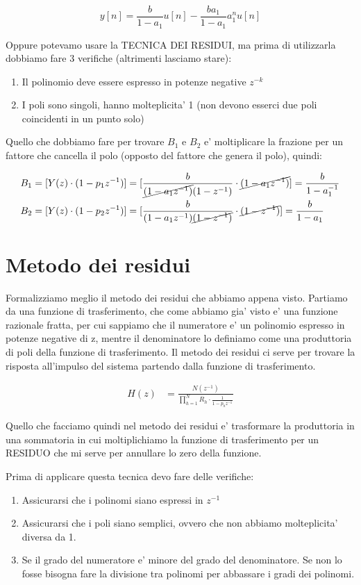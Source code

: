 \[
    y[n] = \frac{b}{1 - a_1} u[n] - \frac{b a_1}{1 - a_1} a_1^n u[n]
\]

Oppure potevamo usare la TECNICA DEI RESIDUI, ma prima di utilizzarla dobbiamo fare 3 verifiche (altrimenti lasciamo stare):
\begin{enumerate}
    \item Il polinomio deve essere espresso in potenze negative $z^{-k}$
    \item I poli sono singoli, hanno molteplicita' 1 (non devono esserci due poli coincidenti in un punto solo)
\end{enumerate}

Quello che dobbiamo fare per trovare $B_1$ e $B_2$ e' moltiplicare la frazione per un fattore che cancella il polo (opposto del fattore che genera il polo), quindi:

\[\begin{split}
    B_1 &= [Y(z) \cdot(1 - p_1z^{-1})] = [\frac{b}{\cancel{(1 - a_1 z^{-1})}(1 - z^{-1})} \cdot \cancel{(1 - a_1 z^{-1})}] = \frac{b}{1 - a_1^{-1}} \\
    B_2 &= [Y(z) \cdot(1 - p_2z^{-1})] = [\frac{b}{(1 - a_1 z^{-1}) \cancel{(1 - z^{-1})}} \cdot \cancel{(1 - z^{-1})}] = \frac{b}{1 - a_1} \\
\end{split}\]

\section{Metodo dei residui}
Formalizziamo meglio il metodo dei residui che abbiamo appena visto.
Partiamo da una funzione di trasferimento, che come abbiamo gia' visto e' una funzione razionale fratta, per cui sappiamo che il numeratore e' un polinomio espresso in potenze negative di z, mentre il denominatore lo definiamo come una produttoria di poli della funzione di trasferimento. Il metodo dei residui ci serve per trovare la risposta all'impulso del sistema partendo dalla funzione di trasferimento.

\[\begin{split}
    H(z) &= \frac{N(z^{-1})}{\prod_{h=1}^{N} R_h \cdot \frac{1}{1 - p_h z^{-1}}}
\end{split}\]

Quello che facciamo quindi nel metodo dei residui e' trasformare la produttoria in una sommatoria in cui moltiplichiamo la funzione di trasferimento per un RESIDUO che mi serve per annullare lo zero della funzione.

Prima di applicare questa tecnica devo fare delle verifiche:
\begin{enumerate}
    \item Assicurarsi che i polinomi siano espressi in $z^{-1}$
    \item Assicurarsi che i poli siano semplici, ovvero che non abbiamo molteplicita' diversa da 1.
    \item Se il grado del numeratore e' minore del grado del denominatore. Se non lo fosse bisogna fare la divisione tra polinomi per abbassare i gradi dei polinomi.
\end{enumerate}

